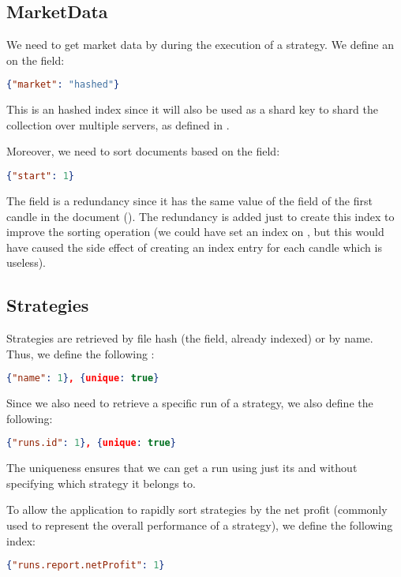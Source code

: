 \subsection{MarketData}

We need to get market data by  during the execution of a strategy.
We define an  on the  field:

\begin{lstlisting}[language=json]
{"market": "hashed"}
\end{lstlisting}

This is an hashed index since it will also be used as a shard key to shard the
collection over multiple servers, as defined in .

Moreover, we need to sort documents based on the  field:

\begin{lstlisting}[language=json]
{"start": 1}
\end{lstlisting}

The  field is a redundancy since it has the same value of the
 field of the first candle in the document (). The
redundancy is added just to create this index to improve the sorting operation
(we could have set an index on , but this would have caused the
side effect of creating an index entry for each candle which is useless).

\subsection{Strategies}

Strategies are retrieved by file hash (the  field, already indexed)
or by name. Thus, we define the following :

\begin{lstlisting}[language=json]
{"name": 1}, {unique: true}
\end{lstlisting}

Since we also need to retrieve a specific run of a strategy, we also define the
following:

\begin{lstlisting}[language=json]
{"runs.id": 1}, {unique: true}
\end{lstlisting}

The uniqueness ensures that we can get a run using just its  and
without specifying which strategy it belongs to.

To allow the application to rapidly sort strategies by the net profit (commonly
used to represent the overall performance of a strategy), we define the
following index:

\begin{lstlisting}[language=json]
{"runs.report.netProfit": 1}
\end{lstlisting}
